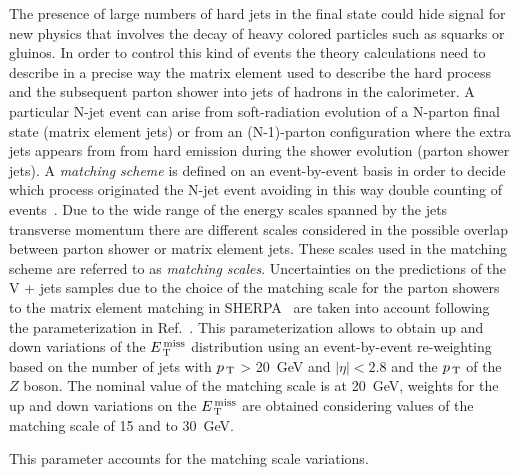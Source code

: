 The presence of large numbers of hard jets in the final state could hide signal
for new physics that involves the decay of heavy colored particles such as
squarks or gluinos. In order to control this kind of events the theory
calculations need to describe in a precise way the matrix element used to
describe the hard process and the subsequent parton shower into jets of hadrons
in the calorimeter. A particular N-jet event can arise from soft-radiation
evolution of a N-parton final state (matrix element jets) or from an
(N-1)-parton configuration where the extra jets appears from from hard emission
during the shower evolution (parton shower jets). A \emph{matching scheme} is
defined on an event-by-event basis in order to decide which process originated
the N-jet event avoiding in this way double counting of
events~\cite{Matching}. Due to the wide range of the energy scales spanned by
the jets transverse momentum there are different scales considered in the
possible overlap between parton shower or matrix element jets. These scales used
in the matching scheme are referred to as \emph{matching scales}. Uncertainties
on the predictions of the V + jets samples due to the choice of the matching
scale for the parton showers to the matrix element matching in
SHERPA~\cite{SHERPAGenerator} are taken into account following the
parameterization in Ref.~\cite{VplusJetsModeling}. This parameterization allows
to obtain up and down variations of the $E_\mathrm{\, T}^\mathrm{\, miss}$ distribution using an
event-by-event re-weighting based on the number of jets with $p_\mathrm{\, T}$ > 20~GeV and
$|\eta| < 2.8$ and the $p_\mathrm{\, T}$ of the $Z$ boson. The nominal value of the matching
scale is at 20~GeV, weights for the up and down variations on the $E_\mathrm{\, T}^\mathrm{\, miss}$ are
obtained considering values of the matching scale of 15 and to 30~GeV.
\begin{description}[font=\normalfont]
\item[ckkw:] This parameter accounts for the matching scale variations.
\end{description}
